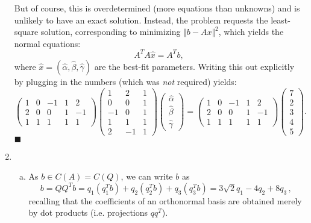 \documentclass[12pt]{article}
\begin{document}
\begin{enumerate}[1.]
\[    \]
    But of course, this is overdetermined (more equations than unknowns) and is unlikely to have an exact solution.
    Instead, the problem requests the least-square solution, corresponding to minimizing $\Vert b - Ax \Vert^2$, which
    yields the normal equations:
    \[ \boxed{A^T A \hat{x} = A^T b} ,\]
    where $\hat{x} = (\hat{\alpha}, \hat{\beta}, \hat{\gamma})$ are the best-fit parameters.
    Writing this out explicitly by plugging in the numbers (which was \emph{not} required) yields:
    \[
    \boxed{\begin{pmatrix} 
    1 & 0 & -1 & 1 & 2 \\
    2 & 0 & 0 & 1 & -1\\
    1 & 1 & 1 & 1 & 1
    \end{pmatrix} 
    \begin{pmatrix} 
    1 & 2 & 1 \\
    0 & 0 & 1 \\
    -1 & 0 & 1 \\
    1 & 1 & 1 \\
    2 & -1 & 1 
    \end{pmatrix} 
    \begin{pmatrix} \hat{\alpha} \\ \hat{\beta} \\ \hat{\gamma} \end{pmatrix} = \begin{pmatrix} 1 & 0 & -1 & 1 & 2 \\
    2& 0 & 0 & 1 & -1\\
    1 & 1 & 1 & 1 & 1
    \end{pmatrix} \begin{pmatrix} 7 \\ 2 \\ 3 \\ 4 \\ 5 \end{pmatrix}}.
    \]
    \hfill $\blacksquare$
    
    \newpage
    \item \begin{enumerate}[(a)]
        \item As $b \in C(A) = C(Q)$, we can write $b$ as
        \[
        b = QQ^T b = q_1 (q_1^T b) +   q_2 (q_2^T b) + q_3 (q_3^T b) =  \boxed{3\sqrt{2} q_1 -4q_2 + 8 q_3} \, ,
        \]
        recalling that the coefficients of an orthonormal basis are obtained merely by dot products (i.e. projections $qq^T$).
        

\end{enumerate}
\end{enumerate}
\end{document}
